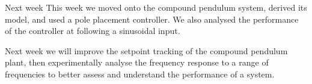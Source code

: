 \documentclass[9pt]{beamer-control}
\begin{document}
\begin{frame}{Next week}
	This week we moved onto the compound pendulum system, derived its model, and used a pole placement controller. We also analysed the performance of the controller at following a sinusoidal input.
	
	Next week we will improve the setpoint tracking of the compound pendulum plant, then experimentally analyse the frequency response to a range of frequencies to better assess and understand the performance of a system.
\end{frame}
\end{document}
